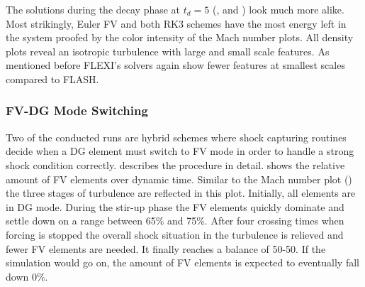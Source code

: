 The solutions during the decay phase at $t_d = 5$
(,
 and
)
look much more alike. Most strikingly, Euler FV and both RK3 schemes have the
most energy left in the system proofed by the color intensity of the Mach
number plots. All density plots reveal an isotropic turbulence with large and
small scale features. As mentioned before FLEXI's solvers again show fewer features
at smallest scales compared to FLASH.







\subsubsection{FV-DG Mode Switching}
\label{sec:stirturb-mode-switching}
Two of the conducted runs are hybrid schemes where shock capturing routines
decide when a DG element must switch to FV mode in order to handle a strong
shock condition correctly.  describes the procedure in
detail.  shows the relative
amount of FV elements over dynamic time. Similar to the Mach number plot
() the three stages of turbulence
are reflected in this plot. Initially, all elements are in DG mode.  During the
stir-up phase the FV elements quickly dominate and settle down on a range
between 65\% and 75\%. After four crossing times when forcing is
stopped the overall shock situation in the turbulence is relieved and fewer FV
elements are needed. It finally reaches a balance of 50-50.  If the simulation
would go on, the amount of FV elements is expected to eventually fall down 0\%.


